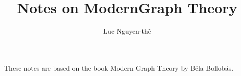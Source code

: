 \documentclass[a4paper,11pt]{article}
\title{Notes on ModernGraph Theory}
\author{Luc Nguyen-th\^e}
\begin{document}
\maketitle

These notes are based on the book Modern Graph Theory by B\'ela Bollob\'as.

\tableofcontents


\end{document}
